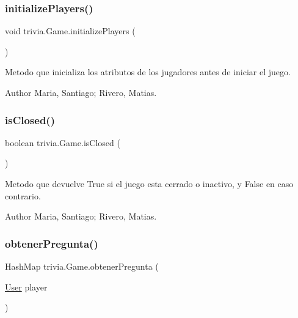 \subsubsection{\texorpdfstring{initialize\+Players()}{initializePlayers()}}
{\footnotesize\ttfamily void trivia.\+Game.\+initialize\+Players (\begin{DoxyParamCaption}{ }\end{DoxyParamCaption})\hspace{0.3cm}{\ttfamily [inline]}}

Metodo que inicializa los atributos de los jugadores antes de iniciar el juego. \begin{DoxyAuthor}{Author}
Maria, Santiago; Rivero, Matias. 
\end{DoxyAuthor}
\mbox{\label{classtrivia_1_1Game_a541c6b1a5cac82e7bc3ba39feccf22a7}} 
\subsubsection{\texorpdfstring{is\+Closed()}{isClosed()}}
{\footnotesize\ttfamily boolean trivia.\+Game.\+is\+Closed (\begin{DoxyParamCaption}{ }\end{DoxyParamCaption})\hspace{0.3cm}{\ttfamily [inline]}}

Metodo que devuelve True si el juego esta cerrado o inactivo, y False en caso contrario. \begin{DoxyAuthor}{Author}
Maria, Santiago; Rivero, Matias. 
\end{DoxyAuthor}
\mbox{\label{classtrivia_1_1Game_a7b5d8f58e7646f91e21f0182d985960a}} 
\subsubsection{\texorpdfstring{obtener\+Pregunta()}{obtenerPregunta()}}
{\footnotesize\ttfamily Hash\+Map trivia.\+Game.\+obtener\+Pregunta (\begin{DoxyParamCaption}\item[{\mbox{\hyperlink{classtrivia_1_1User}{User}}}]{player }\end{DoxyParamCaption})\hspace{0.3cm}{\ttfamily [inline]}}

